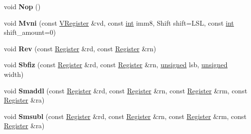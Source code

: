 \begin{DoxyCompactItemize}
\item 
\mbox{\label{classv8_1_1internal_1_1MacroAssembler_a8853cf219af486b2292d91d03457af57}} 
void {\bfseries Nop} ()
\item 
\mbox{\label{classv8_1_1internal_1_1MacroAssembler_afd5ab6d8841ac6322251a1471b8346ae}} 
void {\bfseries Mvni} (const \mbox{\hyperlink{classv8_1_1internal_1_1VRegister}{V\+Register}} \&vd, const \mbox{\hyperlink{classint}{int}} imm8, Shift shift=L\+SL, const \mbox{\hyperlink{classint}{int}} shift\+\_\+amount=0)
\item 
\mbox{\label{classv8_1_1internal_1_1MacroAssembler_aa5f6fea1dd83deebc4267e2f1389eb82}} 
void {\bfseries Rev} (const \mbox{\hyperlink{classv8_1_1internal_1_1Register}{Register}} \&rd, const \mbox{\hyperlink{classv8_1_1internal_1_1Register}{Register}} \&rn)
\item 
\mbox{\label{classv8_1_1internal_1_1MacroAssembler_a7ef612e13bb473b58e6e7b0e22e9e182}} 
void {\bfseries Sbfiz} (const \mbox{\hyperlink{classv8_1_1internal_1_1Register}{Register}} \&rd, const \mbox{\hyperlink{classv8_1_1internal_1_1Register}{Register}} \&rn, \mbox{\hyperlink{classunsigned}{unsigned}} lsb, \mbox{\hyperlink{classunsigned}{unsigned}} width)
\item 
\mbox{\label{classv8_1_1internal_1_1MacroAssembler_a564203b94fe9d532b341d8e57c54dddc}} 
void {\bfseries Smaddl} (const \mbox{\hyperlink{classv8_1_1internal_1_1Register}{Register}} \&rd, const \mbox{\hyperlink{classv8_1_1internal_1_1Register}{Register}} \&rn, const \mbox{\hyperlink{classv8_1_1internal_1_1Register}{Register}} \&rm, const \mbox{\hyperlink{classv8_1_1internal_1_1Register}{Register}} \&ra)
\item 
\mbox{\label{classv8_1_1internal_1_1MacroAssembler_a408cd68cda15eb9b35ee80861adc761d}} 
void {\bfseries Smsubl} (const \mbox{\hyperlink{classv8_1_1internal_1_1Register}{Register}} \&rd, const \mbox{\hyperlink{classv8_1_1internal_1_1Register}{Register}} \&rn, const \mbox{\hyperlink{classv8_1_1internal_1_1Register}{Register}} \&rm, const \mbox{\hyperlink{classv8_1_1internal_1_1Register}{Register}} \&ra)

\end{DoxyCompactItemize}
